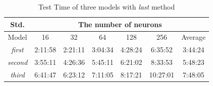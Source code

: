 \documentclass[draft,dvipsnames]{drexel-thesis}
\begin{document}
\begin{thesis}
\begin{table}[!t]
\centering
\caption{Standard Deviation of three models with {\em last} method}
\label{tbl:compare_std_last_1_10}
\end{table}

\begin{table}[!t]
\centering
\caption{Test Time of three models with {\em last} method}
\label{tbl:compare_time_last_1_10}
\begin{tabular}{|c|c|c|c|c|c|c|}
\hline
Std.            & \multicolumn{6}{c|}{The number of neurons}                 \\ \hline
Model           & 16      & 32      & 64      & 128     & 256      & Average \\ \hline
\textit{first}  & 2:11:58 & 2:21:11 & 3:04:34 & 4:28:24 & 6:35:52  & 3:44:24 \\ \hline
\textit{second} & 3:55:11 & 4:26:36 & 5:45:11 & 6:21:02 & 8:33:53  & 5:48:23 \\ \hline
\textit{third}  & 6:41:47 & 6:23:12 & 7:11:05 & 8:17:21 & 10:27:01 & 7:48:05 \\ \hline
\end{tabular}
\end{table}


\end{thesis}
\end{document}

